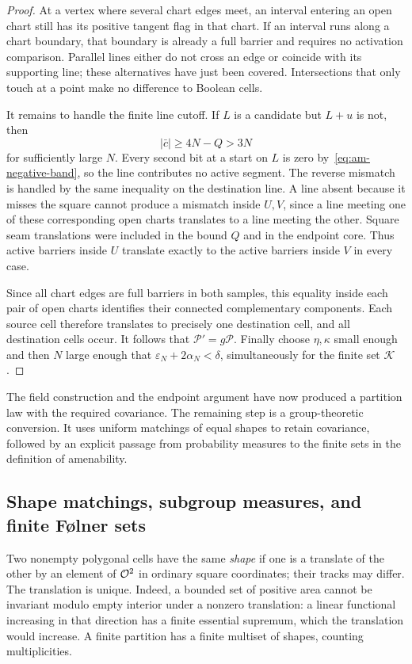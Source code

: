 \begin{proof}
At a vertex where several chart edges meet, an interval entering an open
chart still has its positive tangent flag in that chart.  If an interval
runs along a chart boundary, that boundary is already a full barrier and
requires no activation comparison.  Parallel lines either do not cross an
edge or coincide with its supporting line; these alternatives have just
been covered.  Intersections that only touch at a point make no difference
to Boolean cells.

It remains to handle the finite line cutoff.  If $L$ is a candidate but
$L+u$ is not, then
\[
 |\bar c|\ge4N-Q>3N
\]
for sufficiently large $N$.  Every second bit at a start on $L$ is zero
by~\eqref{eq:am-negative-band}, so the line contributes no active segment.
The reverse mismatch is handled by the same inequality on the destination
line.  A line absent because it misses the square cannot produce a
mismatch inside $U,V$, since a line meeting one of these corresponding
open charts translates to a line meeting the other.  Square seam
translations were included in the bound $Q$ and in the endpoint core.
Thus active barriers inside $U$ translate exactly to the active barriers
inside $V$ in every case.

Since all chart edges are full barriers in both samples, this equality
inside each pair of open charts identifies their connected complementary
components.  Each source cell therefore translates to precisely one
destination cell, and all destination cells occur.  It follows that
$\mathcal P'=g\mathcal P$.  Finally choose $\eta,\kappa$ small enough
and then $N$ large enough that
$\varepsilon_N+2\alpha_N<\delta$, simultaneously for the finite set
$\mathcal K$.
\end{proof}

The field construction and the endpoint argument have now produced a
partition law with the required covariance.  The remaining step is a
group-theoretic conversion.  It uses uniform matchings of equal shapes to
retain covariance, followed by an explicit passage from probability
measures to the finite sets in the definition of amenability.

\subsection{Shape matchings, subgroup measures, and finite F\o lner sets}

Two nonempty polygonal cells have the same \emph{shape} if one is a
translate of the other by an element of $\mathcal O^2$ in ordinary square
coordinates; their tracks may differ.  The translation is unique.  Indeed,
a bounded set of positive area cannot be invariant modulo empty interior
under a nonzero translation: a linear functional increasing in that
direction has a finite essential supremum, which the translation would
increase.  A finite partition has a finite multiset of shapes, counting
multiplicities.

